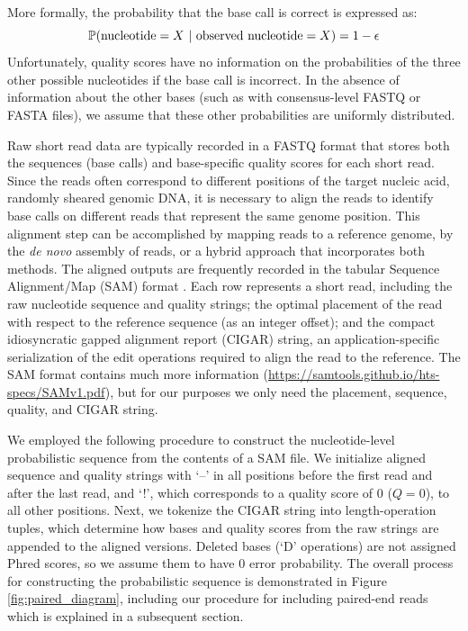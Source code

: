 \documentclass[12pt]{article}
\begin{document}
More formally, the probability that the base call is correct is expressed as: 
\begin{equation}
\label{eq:basecall}
\mathbb{P}(\text{nucleotide}=X \,\,|\,\, \text{observed nucleotide} = X) = 1 - \epsilon
\end{equation}
Unfortunately, quality scores have no information on the probabilities of the three other possible nucleotides if the base call is incorrect.
In the absence of information about the other bases (such as with consensus-level FASTQ or FASTA files), we assume that these other probabilities are uniformly distributed.


Raw short read data are typically recorded in a FASTQ format that stores both the sequences (base calls) and base-specific quality scores for each short read.
Since the reads often correspond to different positions of the target nucleic acid, \eg randomly sheared genomic DNA, it is necessary to align the reads to identify base calls on different reads that represent the same genome position.
This alignment step can be accomplished by mapping reads to a reference genome, by the \emph{de novo} assembly of reads, or a hybrid approach that incorporates both methods.
The aligned outputs are frequently recorded in the tabular Sequence Alignment/Map (SAM) format \cite{liSequenceAlignmentMap2009}.
Each row represents a short read, including the raw nucleotide sequence and quality strings; the optimal placement of the read with respect to the reference sequence (as an integer offset); and the compact idiosyncratic gapped alignment report (CIGAR) string, an application-specific serialization of the edit operations required to align the read to the reference.
The SAM format contains much more information (\url{https://samtools.github.io/hts-specs/SAMv1.pdf}), but for our purposes we only need the placement, sequence, quality, and CIGAR string.


We employed the following procedure to construct the nucleotide-level probabilistic sequence from the contents of a SAM file.
We initialize aligned sequence and quality strings with `--' in all positions before the first read and after the last read, and `!', which corresponds to a quality score of 0 ($Q=0$), to all other positions.
Next, we tokenize the CIGAR string into length-operation tuples, which determine how bases and quality scores from the raw strings are appended to the aligned versions.
Deleted bases (`D' operations) are not assigned Phred scores, so we assume them to have 0 error probability.
The overall process for constructing the probabilistic sequence is demonstrated in Figure \ref{fig:paired_diagram}, including our procedure for including paired-end reads which is explained in a subsequent section.
\end{document}

